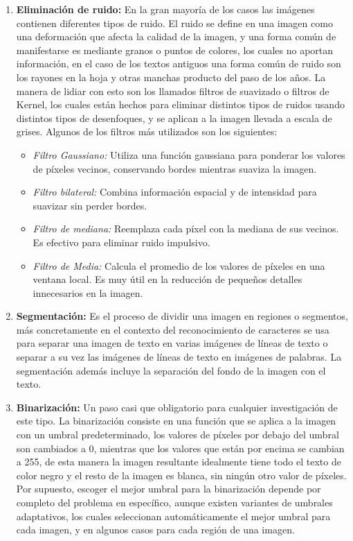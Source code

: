 \documentclass{article}
\begin{document}
\begin{enumerate}
    \item \textbf{Eliminación de ruido:} En la gran mayoría de los casos las imágenes contienen diferentes tipos de ruido. El ruido se define en una imagen como una deformación que afecta la calidad de la imagen, y una forma común de manifestarse es mediante granos o puntos de colores, los cuales no aportan información, en el caso de los textos antiguos una forma común de ruido son los rayones en la hoja y otras manchas producto del paso de los años. La manera de lidiar con esto son los llamados filtros de suavizado o filtros de Kernel, los cuales están hechos para eliminar distintos tipos de ruidos usando distintos tipos de desenfoques, y se aplican a la imagen llevada a escala de grises. Algunos de los filtros más utilizados son los siguientes:
    \begin{itemize}
        \item \emph{Filtro Gaussiano:} Utiliza una función gaussiana para ponderar los valores de píxeles vecinos, conservando bordes mientras suaviza la imagen.

        \item \emph{Filtro bilateral:} Combina información espacial y de intensidad para suavizar sin perder bordes.

        \item \emph{Filtro de mediana:} Reemplaza cada píxel con la mediana de sus vecinos. Es efectivo para eliminar ruido impulsivo.

        \item \emph{Filtro de Media:} Calcula el promedio de los valores de píxeles en una ventana local. Es muy útil en la reducción de pequeños detalles innecesarios en la imagen.
    \end{itemize}

    \item \textbf{Segmentación:} Es el proceso de dividir una imagen en regiones o segmentos, más concretamente en el contexto del reconocimiento de caracteres se usa para separar una imagen de texto en varias imágenes de líneas de texto o separar a su vez las imágenes de líneas de texto en imágenes de palabras. La segmentación además incluye la separación del fondo de la imagen con el texto.

    \item \textbf{Binarización:} Un paso casi que obligatorio para cualquier investigación de este tipo. La binarización consiste en una función que se aplica a la imagen con un umbral predeterminado, los valores de píxeles por debajo del umbral son cambiados a 0, mientras que los valores que están por encima se cambian a 255, de esta manera la imagen resultante idealmente tiene todo el texto de color negro y el resto de la imagen es blanca, sin ningún otro valor de píxeles. Por supuesto, escoger el mejor umbral para la binarización depende por completo del problema en específico, aunque existen variantes de umbrales adaptativos, los cuales seleccionan automáticamente el mejor umbral para cada imagen, y en algunos casos para cada región de una imagen.


\end{enumerate}
\end{document}
